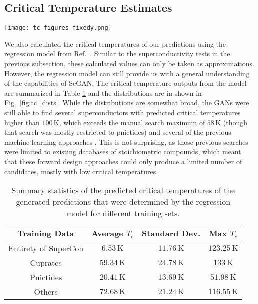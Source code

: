 \subsection{Critical Temperature Estimates}

\begin{figure*}
    \centering
    \texttt{[image: tc\_figures\_fixedy.png]}
    \caption{Distributions of the critical temperatures of the predictions of the four different versions of ScGAN: trained on (a) everything, (b) others, (c) cuprates, (d) pnictides. }
    \label{fig:tc_dists}
\end{figure*}

We also calculated the critical temperatures of our predictions using the regression model from Ref.~\cite{ROTER20201353689}. Similar to the superconductivity tests in the previous subsection, these calculated values can only be taken as approximations. However, the regression model can still provide us with a general understanding of the capabilities of ScGAN. The critical temperature outputs from the model are summarized in Table \ref{tab:critical_temps} and the distributions are in shown in Fig.~\ref{fig:tc_dists}. While the distributions are somewhat broad, the GANs were still able to find several superconductors with predicted critical temperatures higher than $100 \, \mathrm{K}$, which exceeds the manual search maximum of $58\, \mathrm{K}$ (though that search was mostly restricted to pnictides) and several of the previous machine learning approaches \cite{ROTER20201353689,Stanev2018}. This is not surprising, as those previous searches were limited to existing databases of stoichiometric compounds, which meant that these forward design approaches could only produce a limited number of candidates, mostly with low critical temperatures.

\begin{table}[t]
    \centering
    \begin{ruledtabular}
    \begin{tabular}{cccc}
    Training Data & Average $T_c$ & Standard Dev. & Max $T_c$ \\
    \hline
    Entirety of SuperCon & $6.53 \, \mathrm{K}$ & $11.76\,\mathrm{K}$ & $123.25\,\mathrm K$  \\
    Cuprates  & $59.34 \, \mathrm{K}$ & $24.78\,\mathrm{K}$ & $133 \,\mathrm K$ \\
    Pnictides & $20.41 \, \mathrm K$ & $13.69 \, \mathrm K$ & $51.98 \, \mathrm K$ \\
    Others & $72.68 \, \mathrm{K}$ & $21.24 \,\mathrm{K}$ & $116.55\,\mathrm K$ \\
    \end{tabular}
    \end{ruledtabular}
    \caption{Summary statistics of the predicted critical temperatures of the generated predictions that were determined by the regression model for different training sets.}
    \label{tab:critical_temps}
\end{table}

